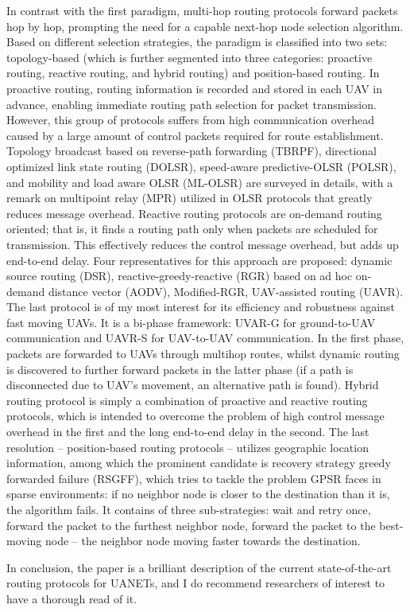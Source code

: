 \documentclass[12pt, a4paper, onside]{article}
\begin{document}
In contrast with the first paradigm, multi-hop routing protocols forward packets hop by hop, prompting the need for a capable next-hop node selection algorithm. Based on different selection strategies, the paradigm is classified into two sets: topology-based (which is further segmented into three categories: proactive routing, reactive routing, and hybrid routing) and position-based routing. In proactive routing, routing information is recorded and stored in each UAV in advance, enabling immediate routing path selection for packet transmission. However, this group of protocols suffers from high communication overhead caused by a large amount of control packets required for route establishment. Topology broadcast based on reverse-path forwarding (TBRPF), directional optimized link state routing (DOLSR), speed-aware predictive-OLSR (POLSR), and mobility and load aware OLSR (ML-OLSR) are surveyed in details, with a remark on multipoint relay (MPR) utilized in OLSR protocols that greatly reduces message overhead. Reactive routing protocols are on-demand routing oriented; that is, it finds a routing path only when packets are scheduled for transmission. This effectively reduces the control message overhead, but adds up end-to-end delay. Four representatives for this approach are proposed: dynamic source routing (DSR), reactive-greedy-reactive (RGR) based on ad hoc on-demand distance vector (AODV), Modified-RGR, UAV-assisted routing (UAVR). The last protocol is of my most interest for its efficiency and robustness against fast moving UAVs. It is a bi-phase framework: UVAR-G for ground-to-UAV communication and UAVR-S for UAV-to-UAV communication. In the first phase, packets are forwarded to UAVs through multihop routes, whilst dynamic routing is discovered to further forward packets in the latter phase (if a path is disconnected due to UAV's movement, an alternative path is found). Hybrid routing protocol is simply a combination of proactive and reactive routing protocols, which is intended to overcome the problem of high control message overhead in the first and the long end-to-end delay in the second. The last resolution -- position-based routing protocols -- utilizes geographic location information, among which the prominent candidate is recovery strategy greedy forwarded failure (RSGFF), which tries to tackle the problem GPSR faces in sparse environments: if no neighbor node is closer to the destination than it is, the algorithm fails. It contains of three sub-strategies: wait and retry once, forward the packet to the furthest neighbor node, forward the packet to the best-moving node -- the neighbor node moving faster towards the destination.

In conclusion, the paper is a brilliant description of the current state-of-the-art routing protocols for UANETs, and I do recommend researchers of interest to have a thorough read of it.

\printbibliography
\end{document}
